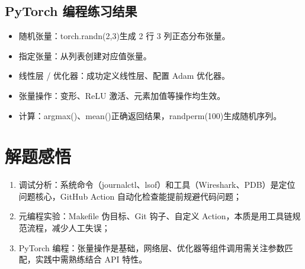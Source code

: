 \documentclass[10.5pt]{ctexart}
\begin{document}
\subsection{PyTorch 编程练习结果}
\begin{itemize}
\item 随机张量：torch.randn(2,3)生成 2 行 3 列正态分布张量。
\item 指定张量：从列表创建对应值张量。
\item 线性层 / 优化器：成功定义线性层、配置 Adam 优化器。
\item 张量操作：变形、ReLU 激活、元素加值等操作均生效。
\item 计算：argmax()、mean()正确返回结果，randperm(100)生成随机序列。
\end{itemize}

\section{解题感悟}
\begin{enumerate}
    \item 调试分析：系统命令（journalctl、lsof）和工具（Wireshark、PDB）是定位问题核心，GitHub Action 自动化检查能提前规避代码问题；
    \item 元编程实验：Makefile 伪目标、Git 钩子、自定义 Action，本质是用工具链规范流程，减少人工失误；
    \item PyTorch 编程：张量操作是基础，网络层、优化器等组件调用需关注参数匹配，实践中需熟练结合 API 特性。
\end{enumerate}
\end{document}
